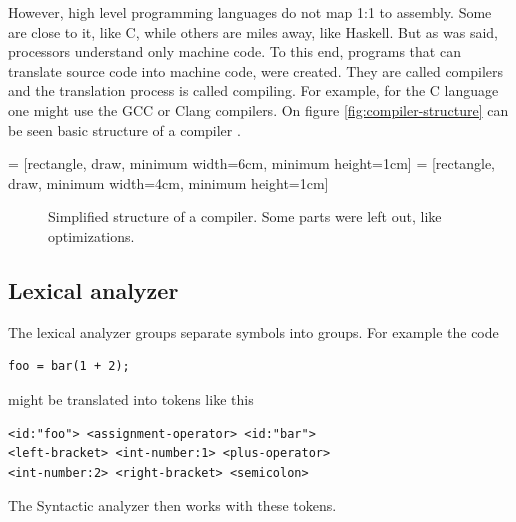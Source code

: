 However, high level programming languages do not map 1:1 to assembly. Some are
close to it, like C, while others are miles away, like Haskell. But as was
said, processors understand only machine code. To this end, programs that can
translate source code into machine code, were created. They are called
compilers and the translation process is called compiling. For example, for the
C language one might use the GCC or Clang compilers. On figure
\ref{fig:compiler-structure} can be seen basic structure of a compiler
\cite{dragon-book}. 

 = [rectangle, draw, minimum width=6cm, minimum height=1cm] 
 = [rectangle, draw, minimum width=4cm, minimum height=1cm] 
\begin{figure}\label{fig:compiler-structure}
    {\centering
    \par}
    \caption{Simplified structure of a compiler. Some parts were left out, like
    optimizations.}
    \label{fig:compiler_tikz}
\end{figure}

\subsection{Lexical analyzer}
The lexical analyzer groups separate symbols into groups. For example the code
\begin{verbatim}
foo = bar(1 + 2);
\end{verbatim}
might be translated into tokens like this
\begin{lstlisting}[stringstyle=\color{black}]
<id:"foo"> <assignment-operator> <id:"bar"> 
<left-bracket> <int-number:1> <plus-operator> 
<int-number:2> <right-bracket> <semicolon>
\end{lstlisting}
The Syntactic analyzer then works with these tokens.

